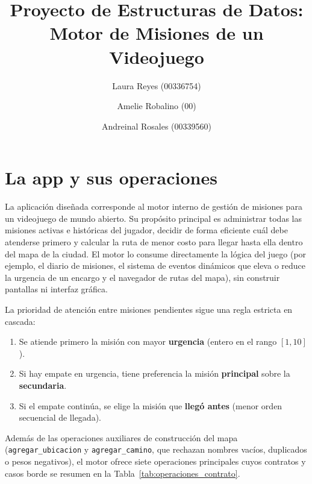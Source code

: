 \documentclass[11pt,a4paper]{article}
\title{Proyecto de Estructuras de Datos: Motor de Misiones de un Videojuego}
\author{
  Laura Reyes (00336754) \and
  Amelie Robalino (00) \and
  Andreinal Rosales (00339560)
}
\begin{document}
\maketitle

\section{La app y sus operaciones}

La aplicación diseñada corresponde al motor interno de gestión de misiones para un videojuego de mundo abierto. Su propósito principal es administrar todas las misiones activas e históricas del jugador, decidir de forma eficiente cuál debe atenderse primero y calcular la ruta de menor costo para llegar hasta ella dentro del mapa de la ciudad. El motor lo consume directamente la lógica del juego (por ejemplo, el diario de misiones, el sistema de eventos dinámicos que eleva o reduce la urgencia de un encargo y el navegador de rutas del mapa), sin construir pantallas ni interfaz gráfica.

La prioridad de atención entre misiones pendientes sigue una regla estricta en cascada:
\begin{enumerate}
  \item Se atiende primero la misión con mayor \textbf{urgencia} (entero en el rango $[1, 10]$).
  \item Si hay empate en urgencia, tiene preferencia la misión \textbf{principal} sobre la \textbf{secundaria}.
  \item Si el empate continúa, se elige la misión que \textbf{llegó antes} (menor orden secuencial de llegada).
\end{enumerate}

Además de las operaciones auxiliares de construcción del mapa (\texttt{agregar\_ubicacion} y \texttt{agregar\_camino}, que rechazan nombres vacíos, duplicados o pesos negativos), el motor ofrece siete operaciones principales cuyos contratos y casos borde se resumen en la Tabla~\ref{tab:operaciones_contrato}.
\end{document}
